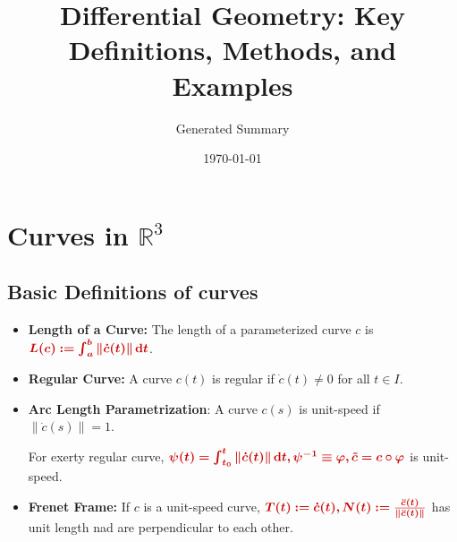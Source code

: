 \documentclass[a4paper,12pt]{article}
\title{\textbf{Differential Geometry: Key Definitions, Methods, and Examples}}
\author{Generated Summary}
\date{\today}
\newcommand{\key}[1]{\textcolor{keywordcolor}{\textbf{#1}}}
\newcommand{\formu}[1]{\textcolor{formulacolor}{\bm{#1}}}
\renewcommand{\d}{\mathop{}\!\mathrm{d}}
\begin{document}
\section{Curves in $\mathbb{R}^3$}

\subsection{Basic Definitions of curves}

\begin{itemize}
    \item \key{Length of a Curve:} The length of a parameterized curve $c$ is $\formu{L(c):=\int_a^b\|\dot{c}(t)\|\d t}$.
    \item \key{Regular Curve:} A curve $c(t)$ is regular if $\dot{c}(t) \neq 0$ for all $t\in I$.
    \item \key{Arc Length Parametrization}: A curve $c(s)$ is unit-speed if $\|\dot{c}(s)\| = 1$.\par
    For exerty regular curve, $\formu{\psi(t)=\int_{t_0}^t\|\dot{c}(t)\|\d t,\psi^{-1}\equiv \varphi,\tilde{c}=c\circ\varphi}$ is unit-speed.
    \item \key{Frenet Frame:} If $c$ is a unit-speed curve, $\formu{T(t):=\dot{c}(t),N(t):=\frac{\ddot{c}(t)}{\|\ddot{c}(t)\|}}$ has unit length nad are perpendicular to each other.
\end{itemize}
\end{document}
